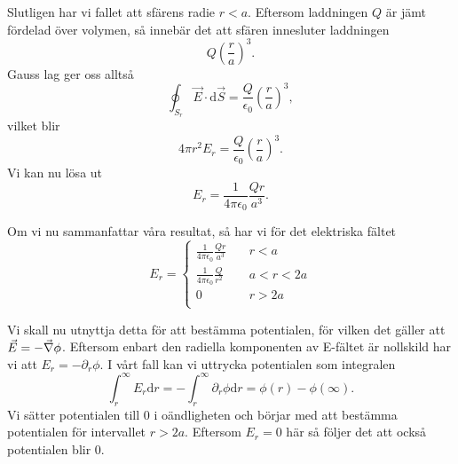 \documentclass[%
oneside,                 %
final,                   %
10pt]{article}
\newenvironment{notice_mdfboxadmon}[1][]{
\begin{notice_mdfboxmdframed}[frametitle=#1]
}
{
\end{notice_mdfboxmdframed}
}
\begin{document}
\begin{notice_mdfboxadmon}
Slutligen har vi fallet att sfärens radie $r < a$.  Eftersom laddningen $Q$
är jämt fördelad över volymen, så innebär det att sfären innesluter
laddningen
\begin{equation}
  Q \left(\frac{r}{a}\right)^3.
\end{equation}
Gauss lag ger oss allts\aa
\begin{equation}
  \oint_{S_r} \vec{E} \cdot \mbox{d}\vec{S} = \frac{Q}{\epsilon_0}
\left(\frac{r}{a}\right)^3,
\end{equation}
vilket blir
\begin{equation}
  4\pi r^2 E_r = \frac{Q}{\epsilon_0}\left(\frac{r}{a}\right)^3.
\end{equation}
Vi kan nu lösa ut 
\begin{equation}
  E_r = \frac{1}{4\pi \epsilon_0} \frac{Qr}{a^3}.
\end{equation}

Om vi nu sammanfattar våra resultat, så har vi för det elektriska
fältet
\begin{equation}
  E_r = \left\{\begin{array}{ll}
\frac{1}{4\pi \epsilon_0} \frac{Qr}{a^3} \quad & r < a\\
\frac{1}{4\pi \epsilon_0} \frac{Q}{r^2} & a < r < 2a\\
0 & r > 2a\\
\end{array}\right.
\end{equation}

Vi skall nu utnyttja detta för att bestämma potentialen, för vilken det
gäller att $\vec{E} = - \vec{\nabla} \phi$.  Eftersom enbart den radiella komponenten av E-fältet är nollskild har vi att $E_r = -\partial_r \phi$. I vårt fall kan vi uttrycka 
potentialen som integralen
\begin{equation}
  \int_r^\infty E_r \mbox{d}r = -\int_r^\infty \partial_r \phi \mbox{d}r = \phi\left(r\right) - \phi(\infty).
\end{equation}
Vi sätter potentialen till 0 i oändligheten och börjar med att bestämma potentialen för intervallet
$r > 2a$.  Eftersom $E_r = 0$ här så följer det att också potentialen
blir 0.  


\end{notice_mdfboxadmon}
\end{document}
